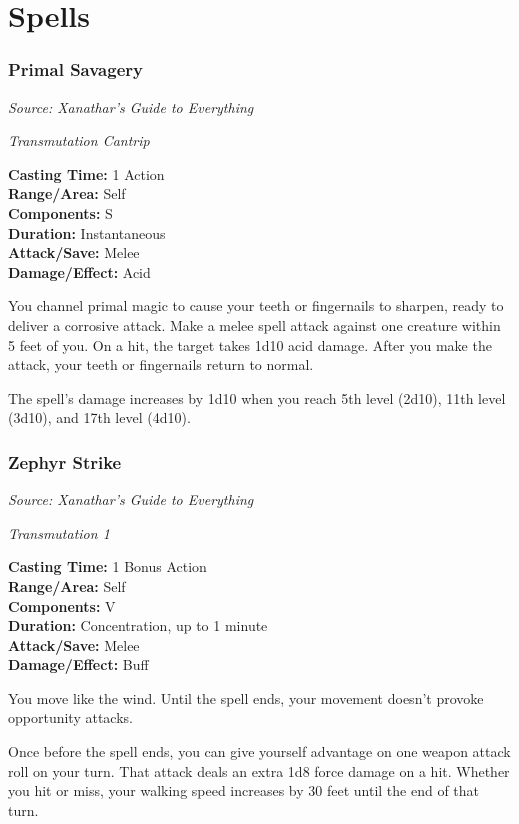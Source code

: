 \documentclass[
  letterpaper,12pt,twoside,twocolumn,openany,
  nodeprecatedcode,bg=full]{dndbook}
\begin{document}
\section{Spells}\label{spells}

\subsubsection{Primal Savagery}\label{primal-savagery}

\emph{Source: Xanathar's Guide to Everything}

\emph{Transmutation Cantrip}

\textbf{Casting Time:} 1 Action\\
\textbf{Range/Area:} Self\\
\textbf{Components:} S\\
\textbf{Duration:} Instantaneous\\
\textbf{Attack/Save:} Melee\\
\textbf{Damage/Effect:} Acid

You channel primal magic to cause your teeth or fingernails to sharpen,
ready to deliver a corrosive attack. Make a melee spell attack against
one creature within 5 feet of you. On a hit, the target takes 1d10 acid
damage. After you make the attack, your teeth or fingernails return to
normal.

The spell's damage increases by 1d10 when you reach 5th level (2d10),
11th level (3d10), and 17th level (4d10).

\subsubsection{Zephyr Strike}\label{zephyr-strike}

\emph{Source: Xanathar's Guide to Everything}

\emph{Transmutation 1}

\textbf{Casting Time:} 1 Bonus Action\\
\textbf{Range/Area:} Self\\
\textbf{Components:} V\\
\textbf{Duration:} Concentration, up to 1 minute\\
\textbf{Attack/Save:} Melee\\
\textbf{Damage/Effect:} Buff

You move like the wind. Until the spell ends, your movement doesn't
provoke opportunity attacks.

Once before the spell ends, you can give yourself advantage on one
weapon attack roll on your turn. That attack deals an extra 1d8 force
damage on a hit. Whether you hit or miss, your walking speed increases
by 30 feet until the end of that turn.
\end{document}
